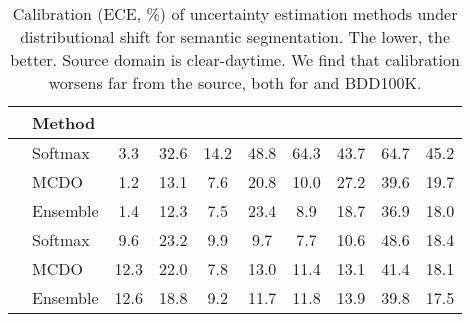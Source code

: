\begin{table}[t]
\centering
\footnotesize
\setlength{\tabcolsep}{8pt}
\setlength{\tabcolsep}{4pt}
\begin{tabular}{llcccccccc}
 & \textbf{Method}  &
  \parbox[t]{8mm}{} &
  \parbox[t]{2mm}{} &
  \parbox[t]{2mm}{} &
  \parbox[t]{2mm}{} &
  \parbox[t]{2mm}{} &
  \parbox[t]{2mm}{} &
  \parbox[t]{2mm}{} & 
  \parbox[t]{5mm}{} \\ \midrule
\parbox[t]{2mm}{}  & Softmax  & 3.3 & 32.6 & 14.2 & 48.8 & 64.3 & 43.7 & 64.7 & 45.2\\
& MCDO & 1.2 & 13.1 & 7.6 & 20.8 & 10.0 & 27.2 & 39.6 & 19.7 \\
    & Ensemble & 1.4 & 12.3 & 7.5 & 23.4 & 8.9 & 18.7 & 36.9 & 18.0 \\\midrule
\parbox[t]{2mm}{} & Softmax & 9.6 & 23.2 & 9.9 & 9.7 & 7.7 & 10.6 & 48.6 & 18.4 \\
& MCDO &  12.3 & 22.0 & 7.8 & 13.0 & 11.4 & 13.1 & 41.4 & 18.1 \\
& Ensemble & 12.6 & 18.8 & 9.2 & 11.7 & 11.8 & 13.9 & 39.8 & 17.5\\
                      \bottomrule
\end{tabular}\caption{Calibration (ECE, \%) of uncertainty estimation methods under distributional shift for semantic segmentation. The lower, the better. Source domain is clear-daytime. We find that calibration worsens far from the source, both for \thedataset and BDD100K.} \label{tab:segmentation_uncertainty} 
\vspace{-3mm}
\end{table}

